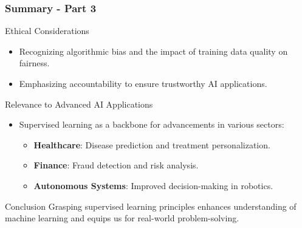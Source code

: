 \documentclass[aspectratio=169]{beamer}
\begin{document}
\begin{frame}[fragile]
    \frametitle{Summary - Part 3}
    \begin{block}{Ethical Considerations}
        \begin{itemize}
            \item Recognizing algorithmic bias and the impact of training data quality on fairness.
            \item Emphasizing accountability to ensure trustworthy AI applications.
        \end{itemize}
    \end{block}

    \begin{block}{Relevance to Advanced AI Applications}
        \begin{itemize}
            \item Supervised learning as a backbone for advancements in various sectors:
                \begin{itemize}
                    \item \textbf{Healthcare}: Disease prediction and treatment personalization.
                    \item \textbf{Finance}: Fraud detection and risk analysis.
                    \item \textbf{Autonomous Systems}: Improved decision-making in robotics.
                \end{itemize}
        \end{itemize}
    \end{block}

    \begin{block}{Conclusion}
        Grasping supervised learning principles enhances understanding of machine learning and equips us for real-world problem-solving.
    \end{block}
\end{frame}
\end{document}

